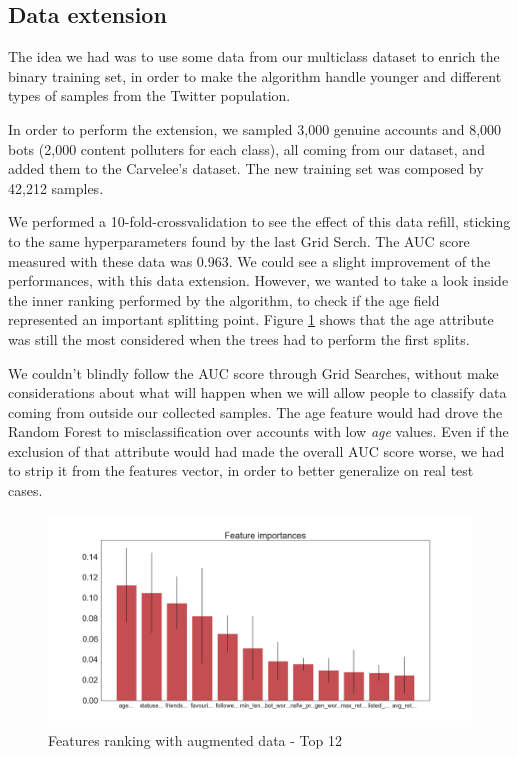 \subsection{Data extension}
The idea we had was to use some data from our multiclass dataset to enrich the binary training set, in order to make the algorithm handle younger and different types of samples from the Twitter population.

In order to perform the extension, we sampled 3,000 genuine accounts and 8,000 bots (2,000 content polluters for each class), all coming from our dataset, and added them to the Carvelee's dataset.
The new training set was composed by 42,212 samples.

We performed a 10-fold-crossvalidation to see the effect of this data refill, sticking to the same hyperparameters found by the last Grid Serch. The AUC score measured with these data was 0.963. We could see a slight improvement of the performances, with this data extension. However, we wanted to take a look inside the inner ranking performed by the algorithm, to check if the age field represented an important splitting point.
Figure \ref{fig:bon_importances_ext} shows that the age attribute was still the most considered when the trees had to perform the first splits.

We couldn't blindly follow the AUC score through Grid Searches, without make considerations about what will happen when we will allow people to classify data coming from outside our collected samples.
The age feature would had drove the Random Forest to misclassification over accounts with low \textit{age} values.
Even if the exclusion of that attribute would had made the overall AUC score worse, we had to strip it from the features vector, in order to better generalize on real test cases.

\begin{figure}[htp!]
	\centering
	\includegraphics[width=\columnwidth]{chapter5/figure/bon_importances_extensions.png}
	\caption{Features ranking with augmented data - Top 12 }
	\label{fig:bon_importances_ext}
\end{figure}

